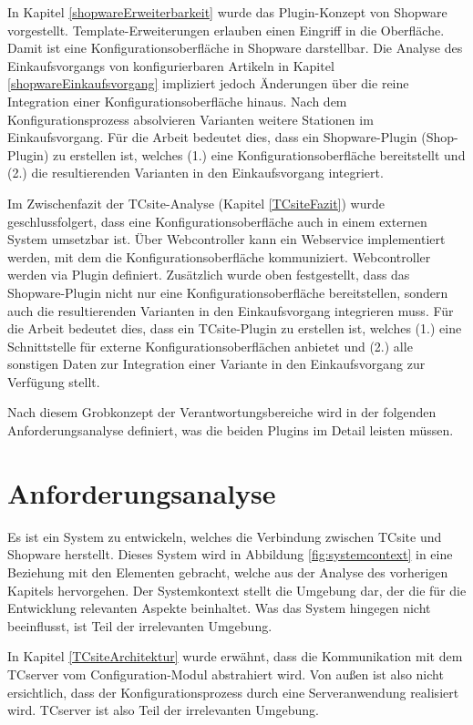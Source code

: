 \documentclass[11pt, a4paper, titlepage, listof=totoc, bibliography=totoc, index=totoc, twoside, openright, headings=normal, draft]{scrreprt}
\begin{document}
In Kapitel \ref{shopwareErweiterbarkeit} wurde das Plugin-Konzept von Shopware vorgestellt. Template-Erweiterungen erlauben einen Eingriff in die Oberfläche. Damit ist eine Konfigurationsoberfläche in Shopware darstellbar. Die Analyse des Einkaufsvorgangs von konfigurierbaren Artikeln in Kapitel \ref{shopwareEinkaufsvorgang} impliziert jedoch Änderungen über die reine Integration einer Konfigurationsoberfläche hinaus. Nach dem Konfigurationsprozess absolvieren Varianten weitere Stationen im Einkaufsvorgang. Für die Arbeit bedeutet dies, dass ein Shopware-Plugin (Shop-Plugin) zu erstellen ist, welches (1.) eine Konfigurationsoberfläche bereitstellt und (2.) die resultierenden Varianten in den Einkaufsvorgang integriert.

Im Zwischenfazit der TCsite-Analyse (Kapitel \ref{TCsiteFazit}) wurde
geschlussfolgert, dass eine Konfigurationsoberfläche auch in einem externen System umsetzbar ist. Über Webcontroller kann ein Webservice implementiert werden, mit dem die Konfigurationsoberfläche kommuniziert. Webcontroller werden via Plugin definiert. Zusätzlich wurde oben festgestellt, dass das Shopware-Plugin nicht nur eine Konfigurationsoberfläche bereitstellen, sondern auch die resultierenden Varianten in den Einkaufsvorgang integrieren muss. Für die Arbeit bedeutet dies, dass ein TCsite-Plugin zu erstellen ist, welches (1.) eine Schnittstelle für externe Konfigurationsoberflächen anbietet und (2.) alle sonstigen Daten zur Integration einer Variante in den Einkaufsvorgang zur Verfügung stellt. 

Nach diesem Grobkonzept der Verantwortungsbereiche wird in der folgenden Anforderungsanalyse definiert, was die beiden Plugins im Detail leisten müssen.

\chapter{Anforderungsanalyse}
Es ist ein System zu entwickeln, welches die Verbindung zwischen TCsite und Shopware herstellt. Dieses System wird in Abbildung \ref{fig:systemcontext} in eine Beziehung mit den Elementen gebracht, welche aus der Analyse des vorherigen Kapitels hervorgehen. Der Systemkontext stellt die Umgebung dar, der die für die Entwicklung relevanten Aspekte beinhaltet. Was das System hingegen nicht beeinflusst, ist Teil der irrelevanten Umgebung.

In Kapitel \ref{TCsiteArchitektur} wurde erwähnt, dass die Kommunikation mit dem TCserver vom Configuration-Modul abstrahiert wird. Von außen ist also nicht ersichtlich, dass der Konfigurationsprozess durch eine Serveranwendung realisiert wird. TCserver ist also Teil der irrelevanten Umgebung.
\end{document}
